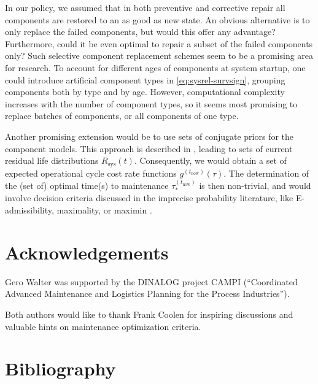 \documentclass[authoryear]{elsarticle}
\renewcommand{\vec}[1]{{\bm#1}}
\newcommand{\uz}{^{(0)}} %
\newcommand{\Rsys}{R_\text{sys}}
\def\ykz{y\uz_k}
\def\nkz{n\uz_k}
\def\tnow{t_\text{now}}
\newcommand{\Rsysnow}{R^{(t_\text{now})}_\text{sys}}
\def\vectknow{\vec{t}_k^{(\tnow)}}
\newcommand{\gnow}{g^{(\tnow)}}
\newcommand{\tausnow}{\tau_*^{(\tnow)}}
\begin{document}
In our policy, we assumed that in both preventive and corrective repair
all components are restored to an as good as new state.
An obvious alternative is to only replace the failed components,
but would this offer any advantage?
Furthermore, could it be even optimal to repair a subset of the failed components only?
Such selective component replacement schemes
seem to be a promising area for research.
To account for different ages of components at system startup,
one could introduce artificial component types in \eqref{eq:sysrel-survsign},
grouping components both by type and by age.
However, computational complexity increases with the number of component types,
so it seems most promising to replace batches of components,
or all components of one type.

Another promising extension would be to use sets of conjugate priors for the component models.
This approach is described in \cite{2016:walter-coolen},
leading to sets of current residual life distributions $\Rsys(t)$.
Consequently, we would obtain a set of expected operational cycle cost rate functions $\gnow(\tau)$.
The determination of the (set of) optimal time(s) to maintenance $\tausnow$
is then non-trivial,
and would involve decision criteria discussed in the imprecise probability literature,
like E-admissibility, maximality, or maximin \citep[see, e.g., \S 8][]{itip}.


\section*{Acknowledgements}

Gero Walter was supported by the DINALOG project CAMPI
(``Coordinated Advanced Maintenance and Logistics Planning for the Process Industries'').

Both authors would like to thank Frank Coolen for inspiring discussions
and valuable hints on maintenance optimization criteria.

\section*{Bibliography}




\end{document}
